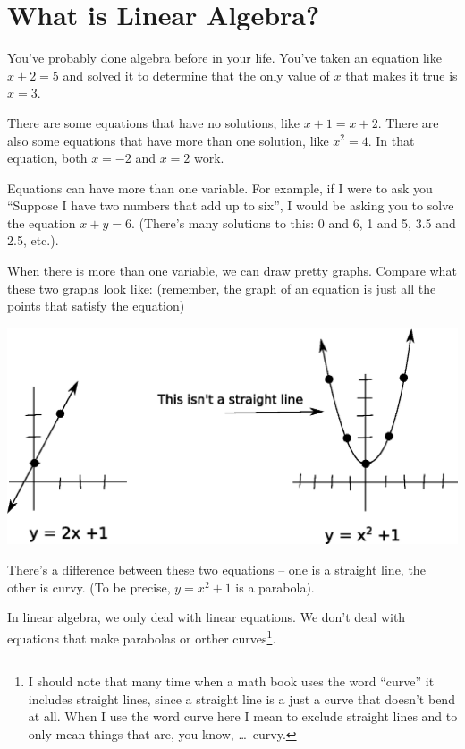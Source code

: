 \documentclass[a4paper,twoside,12pt]{memoir}  %
\begin{document}
\section{What is Linear Algebra?}
You've probably done algebra before in your life.
You've taken an equation like $x + 2 = 5$ and solved it to determine that
the only value of $x$ that makes it true is $x = 3$.

There are some equations that have no solutions, like $x + 1 = x + 2$.
There are also some equations that have more than one solution, like $x^2 = 4$.
In that equation, both $x = -2$ and $x = 2$ work.

Equations can have more than one variable.
For example, if I were to ask you ``Suppose I have two numbers that add up to six'', I would be asking you
to solve the equation $x + y = 6$. (There's many solutions to this: 0 and 6, 1 and 5, 3.5 and 2.5, etc.).

When there is more than one variable, we can draw pretty graphs.
Compare what these two graphs look like: (remember, the graph of an equation is just all the points that satisfy the equation)

\includegraphics[width=\linewidth]{linear-vs-nonlinear.eps}

There's a difference between these two equations -- one is a straight line, the other is curvy.
(To be precise, $y = x^2 + 1$ is a parabola).

In linear algebra, we only deal with linear equations.
We don't deal with equations that make parabolas or orther curves\footnote{I should note that many time when a math book uses the word ``curve'' it includes straight lines, since a straight line is a just a curve that doesn't bend at all. When I use the word curve here I mean to exclude straight lines and to only mean things that are, you know, \ldots\ curvy.}.
\end{document}
